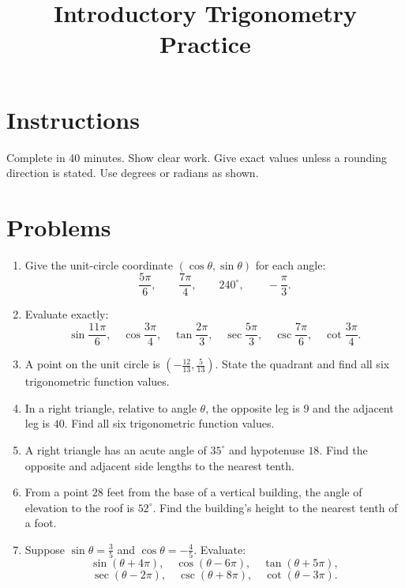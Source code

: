 \documentclass[12pt]{article}
\title{Introductory Trigonometry Practice}
\author{}
\date{}
\begin{document}
\maketitle

\section*{Instructions}
Complete in 40 minutes. Show clear work. Give exact values unless a rounding direction is stated. Use degrees or radians as shown.

\section*{Problems}
\begin{enumerate}[leftmargin=*,itemsep=1em,topsep=0.8em]
  \item Give the unit-circle coordinate $(\cos\theta,\sin\theta)$ for each angle:
  \[
  \frac{5\pi}{6},\qquad \frac{7\pi}{4},\qquad 240^\circ,\qquad -\frac{\pi}{3}.
  \]

  \item Evaluate exactly:
  \[
  \sin\frac{11\pi}{6},\quad
  \cos\frac{3\pi}{4},\quad
  \tan\frac{2\pi}{3},\quad
  \sec\frac{5\pi}{3},\quad
  \csc\frac{7\pi}{6},\quad
  \cot\frac{3\pi}{4}.
  \]

  \item A point on the unit circle is $\left(-\frac{12}{13},\frac{5}{13}\right)$. State the quadrant and find all six trigonometric function values.

  \item In a right triangle, relative to angle $\theta$, the opposite leg is $9$ and the adjacent leg is $40$. Find all six trigonometric function values.

  \item A right triangle has an acute angle of $35^\circ$ and hypotenuse $18$. Find the opposite and adjacent side lengths to the nearest tenth.

  \item From a point $28$ feet from the base of a vertical building, the angle of elevation to the roof is $52^\circ$. Find the building's height to the nearest tenth of a foot.

  \item Suppose $\sin\theta=\frac35$ and $\cos\theta=-\frac45$. Evaluate:
  \[
  \sin(\theta+4\pi),\quad
  \cos(\theta-6\pi),\quad
  \tan(\theta+5\pi),
  \]
  \[
  \sec(\theta-2\pi),\quad
  \csc(\theta+8\pi),\quad
  \cot(\theta-3\pi).
  \]


\end{enumerate}
\end{document}
